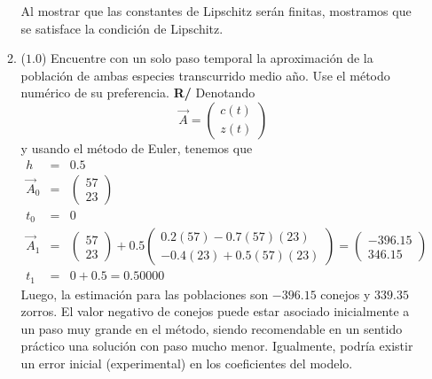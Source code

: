 \documentclass[12pt]{article}
\begin{document}
\begin{enumerate}[leftmargin=*,widest=9]
\begin{enumerate}[label=\alph*]
\begin{itemize}
    \end{itemize}
    Al mostrar que las constantes de Lipschitz serán finitas, mostramos que se satisface la condición de Lipschitz.
    \item (\(1.0\)) Encuentre con un solo paso temporal la aproximación de la población de ambas especies transcurrido medio año. Use el método numérico de su preferencia.
    \textbf{R/}
Denotando
\[
\vec{A} = \begin{pmatrix}c(t)\\z(t)\end{pmatrix}
\]
y usando el método de Euler, tenemos que
\begin{eqnarray*}
h &=& 0.5\\
\vec{A}_0 &=& \begin{pmatrix}57\\23\end{pmatrix}\\
t_0 &=& 0\\
\vec{A}_1 &=& \begin{pmatrix}57\\23\end{pmatrix} + 0.5\begin{pmatrix}0.2(57) - 0.7(57)(23)\\ -0.4(23)+0.5(57)(23)\end{pmatrix}=\begin{pmatrix}-396.15\\346.15\end{pmatrix}\\
t_1 &=& 0 + 0.5 = 0.50000
\end{eqnarray*}
Luego, la estimación para las poblaciones son \(-396.15\) conejos y \(339.35\) zorros. El valor negativo de conejos puede estar asociado inicialmente a un paso muy grande en el método, siendo recomendable en un sentido práctico una solución con paso mucho menor. Igualmente, podría existir un error inicial (experimental) en los coeficientes del modelo.
    \end{enumerate}
\end{enumerate}
\end{document}
